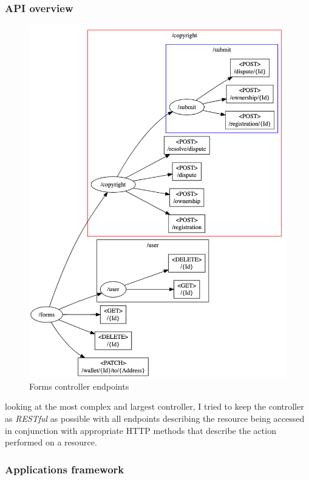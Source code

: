 \subsubsection{API overview}
\begin{figure}[H]
\caption{Forms controller endpoints}
\centering
\includegraphics[width=\textwidth,height=0.5\textheight,keepaspectratio]{images/operational/Forms-Api}
\end{figure}

looking at the most complex and largest controller, I tried to keep the controller as \textit{RESTful} as possible with all endpoints describing the resource being accessed in conjunction with appropriate HTTP methods that describe the action performed on a resource.

\subsubsection{Applications framework}

